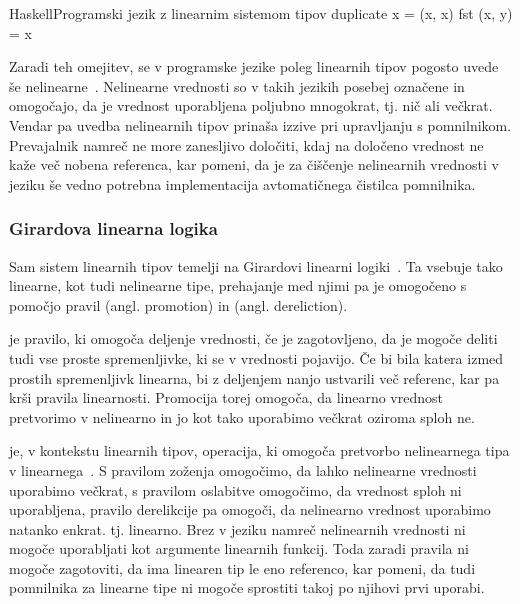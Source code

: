 \begin{code-box}{Haskell}{Programski jezik z linearnim sistemom tipov}
duplicate x = (x, x)
fst (x, y) = x
\end{code-box}

Zaradi teh omejitev, se v programske jezike poleg linearnih tipov pogosto uvede še nelinearne~\cite{pierce2004advanced, wadler1990linear, marshall2022linearity}. Nelinearne vrednosti so v takih jezikih posebej označene in omogočajo, da je vrednost uporabljena poljubno mnogokrat, tj. nič ali večkrat. Vendar pa uvedba nelinearnih tipov prinaša izzive pri upravljanju s pomnilnikom. Prevajalnik namreč ne more zanesljivo določiti, kdaj na določeno vrednost ne kaže več nobena referenca, kar pomeni, da je za čiščenje nelinearnih vrednosti v jeziku še vedno potrebna implementacija avtomatičnega čistilca pomnilnika.

\subsubsection{Girardova linearna logika}

Sam sistem linearnih tipov temelji na Girardovi linearni logiki~\cite{girard1987linear}. Ta vsebuje tako linearne, kot tudi nelinearne tipe, prehajanje med njimi pa je omogočeno s pomočjo pravil  (angl. promotion) in  (angl. dereliction).

 je pravilo, ki omogoča deljenje vrednosti, če je zagotovljeno, da je mogoče deliti tudi vse proste spremenljivke, ki se v vrednosti pojavijo. Če bi bila katera izmed prostih spremenljivk linearna, bi z deljenjem nanjo ustvarili več referenc, kar pa krši pravila linearnosti. Promocija torej omogoča, da linearno vrednost pretvorimo v nelinearno in jo kot tako uporabimo večkrat oziroma sploh ne.

 je, v kontekstu linearnih tipov, operacija, ki omogoča pretvorbo nelinearnega tipa v linearnega~\cite{wadler1991there}. S pravilom zoženja omogočimo, da lahko nelinearne vrednosti uporabimo večkrat, s pravilom oslabitve o\-mo\-go\-či\-mo, da vrednost sploh ni uporabljena, pravilo derelikcije pa omogoči, da nelinearno vrednost uporabimo natanko enkrat. tj. linearno. Brez  v jeziku namreč nelinearnih vrednosti ni mogoče uporabljati kot argumente linearnih funkcij. Toda zaradi pravila  ni mogoče zagotoviti, da ima linearen tip le eno referenco, kar pomeni, da tudi pomnilnika za linearne tipe ni mogoče sprostiti takoj po njihovi prvi uporabi.

